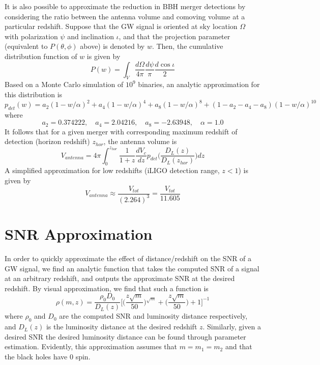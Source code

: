 \documentclass{article}
\begin{document}
It is also possible to approximate the reduction in BBH merger detections by considering the ratio between the antenna volume and comoving volume at a particular redshift. Suppose that the GW signal is oriented at sky location $\Omega$ with polarization $\psi$ and inclination $\iota$, and that the projection parameter (equivalent to $P(\theta, \phi)$ above) is denoted by $w$. Then, the cumulative distribution function of $w$ is given by
\begin{equation}
    P(w) = \int_V \frac{d \Omega}{4 \pi} \frac{d \psi}{\pi} \frac{d \cos \iota}{2}
\end{equation}
Based on a Monte Carlo simulation of $10^9$ binaries, an analytic approximation for this distribution is
\begin{equation}
    p_{det}(w) =a_2(1-w/\alpha)^2 + a_4(1-w/\alpha)^4 + a_8(1-w/\alpha)^8 + (1-a_2-a_4-a_8)(1-w/\alpha)^{10}
\end{equation}
where 
\begin{equation}
    a_2 = 0.374222, \quad a_4 = 2.04216, \quad a_8 = -2.63948, \quad \alpha = 1.0
\end{equation}
It follows that for a given merger with corresponding maximum redshift of detection (horizon redshift) $z_{hor}$, the antenna volume is
\begin{equation}
    V_{antenna} = 4 \pi \int_0^{z_{hor}} \frac{1}{1+z} \frac{dV_c}{dz} p_{det} \Big( \frac{D_L(z)}{D_L(z_{hor})} \Big) dz 
\end{equation}
A simplified approximation for low redshifts (iLIGO detection range, $z < 1$) is given by 
\begin{equation}
    V_{antenna} \approx \frac{V_{tot}}{(2.264)^3} = \frac{V_{tot}}{11.605}
\end{equation}

\section{SNR Approximation}

In order to quickly approximate the effect of distance/redshift on the SNR of a GW signal, we find an analytic function that takes the computed SNR of a signal at an arbitrary redshift, and outputs the approximate SNR at the desired redshift. By visual approximation, we find that such a function is 
\begin{equation}
    \rho(m, z) = \frac{\rho_0 D_0}{D_L(z)} \Big[ \Big(\frac{z \sqrt{m}}{50} \Big)^{\sqrt{m}} + \Big( \frac{z \sqrt{m}}{50} \Big) + 1 \Big]^{-1}
\end{equation}
where $\rho_0$ and $D_0$ are the computed SNR and luminosity distance respectively, and $D_L(z)$ is the luminosity distance at the desired redshift $z$. Similarly, given a desired SNR the desired luminosity distance can be found through parameter estimation. Evidently, this approximation assumes that $m=m_1=m_2$ and that the black holes have 0 spin. \\
\end{document}
